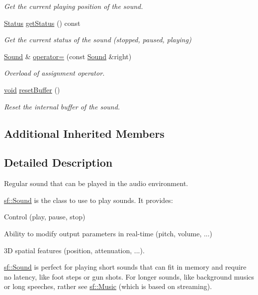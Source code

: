 \begin{DoxyCompactItemize}
\begin{DoxyCompactList}\small\item\em Get the current playing position of the sound. \end{DoxyCompactList}\item 
\hyperlink{classsf_1_1_sound_source_ac43af72c98c077500b239bc75b812f03}{Status} \hyperlink{classsf_1_1_sound_ae8b4084ff8f460b7a2bf9d39e846dab9}{get\-Status} () const 
\begin{DoxyCompactList}\small\item\em Get the current status of the sound (stopped, paused, playing) \end{DoxyCompactList}\item 
\hyperlink{classsf_1_1_sound}{Sound} \& \hyperlink{classsf_1_1_sound_a08c64c9c1dabeebc59fbf2540d81d4dd}{operator=} (const \hyperlink{classsf_1_1_sound}{Sound} \&right)
\begin{DoxyCompactList}\small\item\em Overload of assignment operator. \end{DoxyCompactList}\item 
\hyperlink{glutf90_8h_ac778d6f63f1aaf8ebda0ce6ac821b56e}{void} \hyperlink{classsf_1_1_sound_acb7289d45e06fb76b8292ac84beb82a7}{reset\-Buffer} ()
\begin{DoxyCompactList}\small\item\em Reset the internal buffer of the sound. \end{DoxyCompactList}\end{DoxyCompactItemize}
\subsection*{Additional Inherited Members}


\subsection{Detailed Description}
Regular sound that can be played in the audio environment. 

\hyperlink{classsf_1_1_sound}{sf\-::\-Sound} is the class to use to play sounds. It provides\-: \begin{DoxyItemize}
\item Control (play, pause, stop) \item Ability to modify output parameters in real-\/time (pitch, volume, ...) \item 3\-D spatial features (position, attenuation, ...).\end{DoxyItemize}
\hyperlink{classsf_1_1_sound}{sf\-::\-Sound} is perfect for playing short sounds that can fit in memory and require no latency, like foot steps or gun shots. For longer sounds, like background musics or long speeches, rather see \hyperlink{classsf_1_1_music}{sf\-::\-Music} (which is based on streaming).

